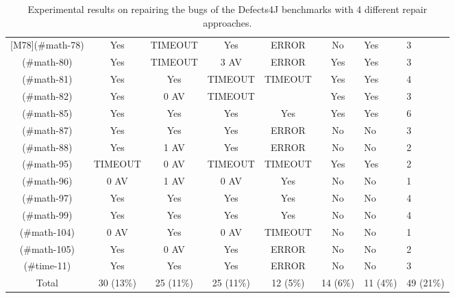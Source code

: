 \begin{table}[!t]
{\begin{tabular}{|c|c|c|c|c|c|}
[M78](#math-78)   & Yes       & TIMEOUT   & Yes       & ERROR     & No        & Yes       &      3 \\
[M80](#math-80)   & Yes       & TIMEOUT   & 3 AV      & ERROR     & Yes       & Yes       &      3 \\
[M81](#math-81)   & Yes       & Yes       & TIMEOUT   & TIMEOUT   & Yes       & Yes       &      4 \\
[M82](#math-82)   & Yes       & 0 AV      & TIMEOUT   &           & Yes       & Yes       &      3 \\
[M85](#math-85)   & Yes       & Yes       & Yes       & Yes       & Yes       & Yes       &      6 \\
[M87](#math-87)   & Yes       & Yes       & Yes       & ERROR     & No        & No        &      3 \\
[M88](#math-88)   & Yes       & 1 AV      & Yes       & ERROR     & No        & No        &      2 \\
[M95](#math-95)   & TIMEOUT   & 0 AV      & TIMEOUT   & TIMEOUT   & Yes       & Yes       &      2 \\
[M96](#math-96)   & 0 AV      & 1 AV      & 0 AV      & Yes       & No        & No        &      1 \\
[M97](#math-97)   & Yes       & Yes       & Yes       & Yes       & No        & No        &      4 \\
[M99](#math-99)   & Yes       & Yes       & Yes       & Yes       & No        & No        &      4 \\
[M104](#math-104) & 0 AV      & Yes       & 0 AV      & TIMEOUT   & No        & No        &      1 \\
[M105](#math-105) & Yes       & 0 AV      & Yes       & ERROR     & No        & No        &      2 \\
\hline
[T11](#time-11)   & Yes       & Yes       & Yes       & ERROR     & No        & No        &      3 \\
\hline
Total             & 30 (13\%) & 25 (11\%) & 25 (11\%) & 12 (5\%)  & 14 (6\%)  & 11 (4\%)  & 49 (21\%)\\
\hline 
\end{tabular}%
}
\caption{Experimental results on repairing the bugs of the Defects4J benchmarks with 4 different repair approaches.}
\end{table}
